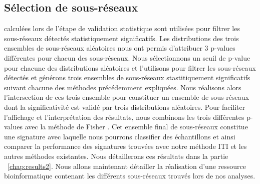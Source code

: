 		\subsection{\textcolor{green!60!black}{Sélection de sous-réseaux}}
			 calculées lors de l'étape de validation statistique sont utilisées pour filtrer les sous-réseaux détectés statistiquement significatifs.
			Les distributions des trois ensembles de sous-réseaux aléatoires nous ont permis d'attribuer 3 p-values différentes pour chacun des sous-réseaux.
			Nous sélectionnons un seuil de p-value pour chacune des distributions aléatoires et l'utilisons pour filtrer les sous-réseaux détectés et générons trois ensembles de sous-réseaux stastitiquement significatifs suivant chacune des méthodes précédemment expliquées.
			Nous réalisons alors l'intersection de ces trois ensemble pour constituer un ensemble de sous-réseaux dont la significativité est validé par trois distributions aléatoires.
			Pour faciliter l'affichage et l'interprétation des résultats, nous combinons les trois différentes p-values avec la méthode de Fisher \citep{Fisher1925}.
			Cet ensemble final de sous-réseaux constitue une signature avec laquelle nous pourrons classifier des échantillons et ainsi comparer la performance des signatures trouvées avec notre méthode ITI et les autres méthodes existantes.
			Nous détaillerons ces résultats dans la partie ~\ref{chap:results2}.
			Nous allons maintenant détailler la réalisation d'une ressource bioinformatique contenant les différents sous-réseaux trouvés lors de nos analyses.

